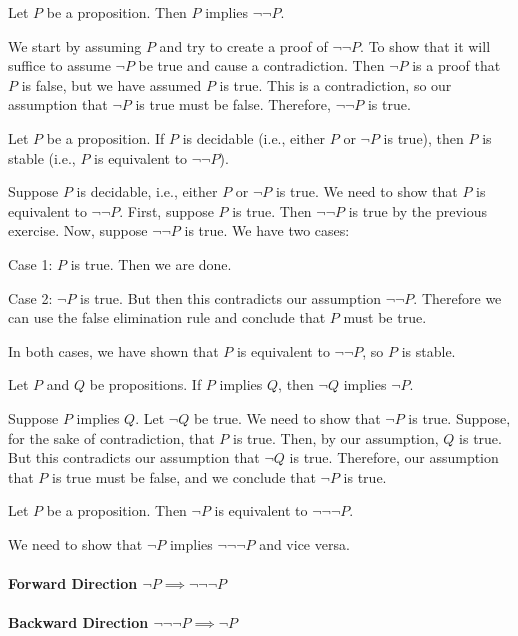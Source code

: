  \begin{Exercise}
Let $P$ be a proposition. Then $P$ implies $\neg\neg P$.
\end{Exercise} \begin{Answer}
We start by assuming $P$ and try to create a proof of $\neg\neg P$. To show that it will suffice to assume $\neg P$ be true and cause a contradiction. Then $\neg P$ is a proof that $P$ is false, but we have assumed $P$ is true. This is a contradiction, so our assumption that $\neg P$ is true must be false. Therefore, $\neg\neg P$ is true.
\end{Answer} \begin{Exercise}
Let $P$ be a proposition. If $P$ is decidable (i.e., either $P$ or $\neg P$ is true), then $P$ is stable (i.e., $P$ is equivalent to $\neg\neg P$).
\end{Exercise} \begin{Answer}
Suppose $P$ is decidable, i.e., either $P$ or $\neg P$ is true. We need to show that $P$ is equivalent to $\neg\neg P$. First, suppose $P$ is true. Then $\neg\neg P$ is true by the previous exercise. Now, suppose $\neg\neg P$ is true. We have two cases:

    Case 1: $P$ is true. Then we are done.
    
    Case 2: $\neg P$ is true. But then this contradicts our assumption $\neg \neg P$. Therefore we can use the false elimination rule and conclude that $P$ must be true.

In both cases, we have shown that $P$ is equivalent to $\neg\neg P$, so $P$ is stable.
\end{Answer} \begin{Exercise}
Let $P$ and $Q$ be propositions. If $P$ implies $Q$, then $\neg Q$ implies $\neg P$.
\end{Exercise} \begin{Answer}
Suppose $P$ implies $Q$. Let $\neg Q$ be true. We need to show that $\neg P$ is true. Suppose, for the sake of contradiction, that $P$ is true. Then, by our assumption, $Q$ is true. But this contradicts our assumption that $\neg Q$ is true. Therefore, our assumption that $P$ is true must be false, and we conclude that $\neg P$ is true.
\end{Answer} \begin{Exercise}
Let $P$ be a proposition. Then $\neg P$ is equivalent to $\neg\neg\neg P$.
\end{Exercise} \begin{Answer}
We need to show that $\neg P$ implies $\neg\neg\neg P$ and vice versa. 

\paragraph{Forward Direction $\neg P \implies \neg\neg\neg P$} 


\paragraph{Backward Direction $\neg\neg\neg P \implies \neg P$}


\end{Answer}

